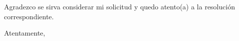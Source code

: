 \documentclass[a4paper,12pt]{article}
\begin{document}
\vspace{0.5cm}

\noindent Agradezco se sirva considerar mi solicitud y quedo atento(a) a la resolución correspondiente.


\noindent Atentamente,

\vspace{2.5cm}


\noindent{}  

\noindent{}      

\noindent{}  

\noindent{} 
\end{document}
